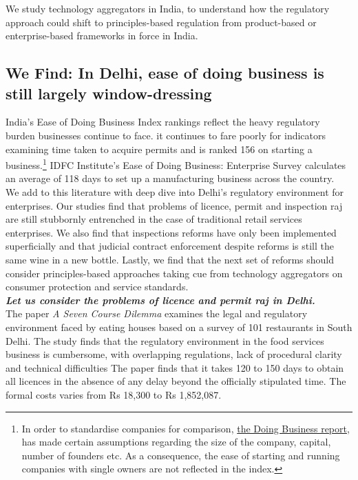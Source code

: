 \documentclass[a4paper, 12pt, twoside]{article}
\begin{document}
We study technology aggregators in India, to understand how the regulatory approach could shift to principles-based regulation from product-based or enterprise-based frameworks in force in India.  \\

\subsection*{We Find: In Delhi, ease of doing business is still largely window-dressing}

India’s Ease of Doing Business Index rankings reflect the heavy regulatory burden businesses continue to face. it continues to fare poorly for indicators examining time taken to acquire permits and is ranked 156 on starting a business.\footnote{In order to standardise companies for comparison, \href{http://www.doingbusiness.org/en/data/exploreeconomies/india}{the Doing Business report}, has made certain assumptions regarding the size of the company, capital, number of founders etc. As a consequence, the ease of starting and running companies with single owners are not reflected in the index. } IDFC Institute’s Ease of Doing Business: Enterprise Survey calculates an average of 118 days to set up a manufacturing business across the country. \\

We add to this literature with deep dive into Delhi’s regulatory environment for enterprises. Our studies find that problems of licence, permit and inspection raj are still stubbornly entrenched in the case of traditional retail services enterprises. We also find that inspections reforms have only been implemented superficially and that judicial contract enforcement despite reforms is still the same wine in a new bottle. Lastly, we find that the next set of reforms should consider principles-based approaches taking cue from technology aggregators on consumer protection and service standards. \\

\textbf{\textit{Let us consider the problems of licence and permit raj in Delhi.}} \\

The paper \textit{A Seven Course Dilemma} examines the legal and regulatory environment faced by eating houses based on a survey of 101 restaurants in South Delhi. The study finds that the regulatory environment in the food services business is cumbersome, with overlapping regulations, lack of procedural clarity and technical difficulties The paper finds that it takes 120 to 150 days to obtain all licences in the absence of any delay beyond the officially stipulated time. The formal costs varies from Rs 18,300 to Rs 1,852,087. \\
\end{document}
